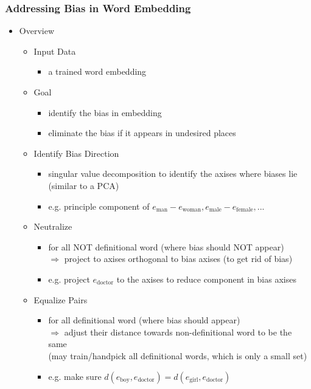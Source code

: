 \subsubsection{Addressing Bias in Word Embedding}
\begin{itemize}
\item Overview
	\begin{itemize}
	\item Input Data
		\begin{itemize}
		\item a trained word embedding
		\end{itemize}
	\item Goal
		\begin{itemize}
		\item identify the bias in embedding
		\item eliminate the bias if it appears in undesired places
		\end{itemize}
	\item Identify Bias Direction
		\begin{itemize}
		\item singular value decomposition to identify the axises where biases lie \\
		(similar to a PCA)
		\item e.g. principle component of $e_\text{man}-e_\text{woman}, e_\text{male}-e_\text{female}, ...$
		\end{itemize}
	\item Neutralize
		\begin{itemize}
		\item for all NOT definitional word (where bias should NOT appear) \\
		$\Rightarrow$ project to axises orthogonal to bias axises (to get rid of bias)
		\item e.g. project $e_\text{doctor}$ to the axises to reduce component in bias axises
		\end{itemize}
	\item Equalize Pairs
		\begin{itemize}
		\item for all definitional word (where bias should appear) \\
		$\Rightarrow$ adjust their distance towards non-definitional word to be the same \\
		(may train/handpick all definitional words, which is only a small set)
		\item e.g. make sure $d(e_\text{boy},e_\text{doctor}) = d(e_\text{girl},e_\text{doctor})$
		\end{itemize}
	\end{itemize}
\end{itemize}

